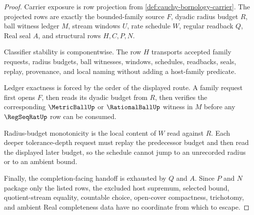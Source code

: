 \begin{proof}
Carrier exposure is row projection from \autoref{def:cauchy-bornology-carrier}. The projected rows are exactly the bounded-family source $F$, dyadic radius budget $R$, ball witness ledger $M$, stream windows $U$, rate schedule $W$, regular readback $Q$, Real seal $A$, and structural rows $H,C,P,N$.

Classifier stability is componentwise. The row $H$ transports accepted family requests, radius budgets, ball witnesses, windows, schedules, readbacks, seals, replay, provenance, and local naming without adding a host-family predicate.

Ledger exactness is forced by the order of the displayed route. A family request first opens $F$, then reads its dyadic budget from $R$, then verifies the corresponding $\MetricBallUp$ or $\RationalBallUp$ witness in $M$ before any $\RegSeqRatUp$ row can be consumed.

Radius-budget monotonicity is the local content of $W$ read against $R$. Each deeper tolerance-depth request must replay the predecessor budget and then read the displayed later budget, so the schedule cannot jump to an unrecorded radius or to an ambient bound.

Finally, the completion-facing handoff is exhausted by $Q$ and $A$. Since $P$ and $N$ package only the listed rows, the excluded host supremum, selected bound, quotient-stream equality, countable choice, open-cover compactness, trichotomy, and ambient Real completeness data have no coordinate from which to escape.
\end{proof}

